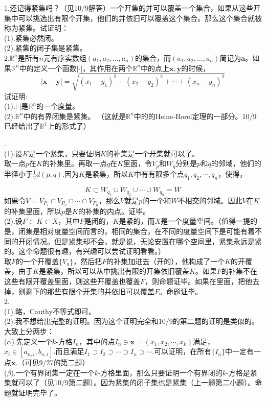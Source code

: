 \documentclass[11pt,a4paper,openany]{article} \usepackage{amssymb,amsfonts, amsmath,ctex,bm}
\begin{document}
\noindent 1.还记得紧集吗？（见10/9解答）一个开集的并可以覆盖一个集合，如果从这些开集中可以挑选出有限个开集，他们的并依旧可以覆盖这个集合。那么这个集合就被称为紧集。试证明：\\
(1).紧集必然闭。\\
(2).紧集的闭子集是紧集。\\
2.$\mathbb{R}^n$是所有$n$元有序实数组$(a_{1},a_{2},\dots,a_{n})$的集合，而$(a_{1},a_{2},\dots,a_{n})$简记为$\bm a$。如果$\mathbb{R}^n$中的定义一个函数$|\cdot|$，其作用在两个$\mathbb{R}^n$中的点上$\bm x,\bm y$的时候，
$$
|\bm{x}-\bm{y}|=\sqrt{(x_{1}-y_{1})^{2}+(x_{2}-y_{2})^{2}+\cdots+(x_{n}-y_{n})^{2}}
$$
试证明:\\
(1).$|\cdot|$是$\mathbb{R}^n$的一个度量。\\
(2).$\mathbb{R}^n$中的有界闭集是紧集。
（这就是$\mathbb{R}^n$中的的Heine-Borel定理的一部分。10/9已经给出了$\mathbb{R}^1$上的形式了）

\newpage
{}.\\
(1).设$K$是一个紧集，只要证明$K$的补集是一个开集就可以了。\\
\indent 取一点$p$在$K$的补集里。再取一点$q$在$K$里面，令$V_p$和$W_q$分别是$p$和$q$的邻域，他们的半径小于$\displaystyle{\frac{1}{2}d(p,q)}$.因为$K$是紧集，所以$K$中有有限多个点$q_1,q_2,\cdots,q_n$，使得，

\[
K \subset W_{q_1}\cup W_{q_2} \cup \cdots \cup W_{q_n}=W
\]
\indent 如果令$V=V_{P_1}\cap V_{P_2} \cap \cdots \cap V_{P_n}$，那么$V$就是$p$的一个和$W$不相交的邻域。因此$V$在$K$的补集里面，所以$p$是$K$的补集的内点。证毕。\\
(2).设$F\subset K\subset X$，其中$F$是闭的，$K$是紧的，而$X$是一个度量空间。（值得一提的是，闭集是相对度量空间而言的，相同的集合，在不同的度量空间下是可能有着不同的开闭情况。但是紧集却不会，就是说，无论安置在哪个空间里，紧集永远是紧的。这个命题很有趣，有兴趣可以尝试证明看看。）\\
\indent 取$F$的一个开覆盖$\{V_a\}$，然后把$F$的补集加进去（开的），他构成了一个$K$的开覆盖，由于$K$是紧集，所以可以从中挑出有限的开集依旧覆盖$K$。如果$F$的补集不在这些有限开覆盖里面，则这些开覆盖也覆盖$F$，则命题证毕。如果在里面，把他去掉，则剩下的那些有限个开集的并依旧可以覆盖$F$。命题证毕。\\
2.\\
(1).略，Cauthy不等式即可。\\
(2).我不想给出完整的证明。因为这个证明完全和10/9的第二题的证明是类似的。大致上分两步：\\
($\alpha$).先定义一个$k$-方格$I_n$，其中的点$I_n \ni \bm{x}=(x_1,x_2,\cdots,x_k)$满足，$x_i \in [a_{n,i},b_{n,i}]$.而且满足$I_1\supset I_2 \supset \cdots \supset I_n \supset \cdots$.可以证明，在所有$\{I_n\}$中一定有一点$\bm{x}$.（可见9/27的第二题）\\
($\beta$).一个有界闭集一定在一个$k$-方格里面，那么只要证明一个有界闭的$k$-方格是紧集就可以了（见10/9第二题）。因为紧集的闭子集也是紧集（上一题第二小题）。命题就证明完毕了。
\end{document}
